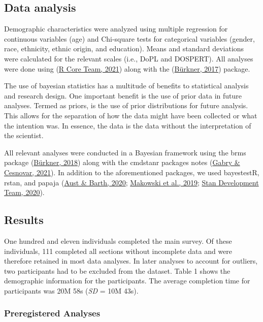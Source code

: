 \documentclass[
  donotrepeattitle,doc, 12pt, a4paper,floatsintext]{apa7}
\begin{document}
\hypertarget{data-analysis}{%
\subsection{Data analysis}\label{data-analysis}}

Demographic characteristics were analyzed using multiple regression for continuous variables (age) and Chi-square tests for categorical variables (gender, race, ethnicity, ethnic origin, and education). Means and standard deviations were calculated for the relevant scales (i.e., DoPL and DOSPERT). All analyses were done using (\protect\hyperlink{ref-rcoreteam2021}{R Core Team, 2021}) along with the (\protect\hyperlink{ref-burkner2017}{Bürkner, 2017}) package.

The use of bayesian statistics has a multitude of benefits to statistical analysis and research design. One important benefit is the use of prior data in future analyses. Termed as priors, is the use of prior distributions for future analysis. This allows for the separation of how the data might have been collected or what the intention was. In essence, the data is the data without the interpretation of the scientist.

All relevant analyses were conducted in a Bayesian framework using the brms package (\protect\hyperlink{ref-burkner2018}{Bürkner, 2018}) along with the cmdstanr packages notes (\protect\hyperlink{ref-gabry2021}{Gabry \& Cesnovar, 2021}). In addition to the aforementioned packages, we used bayestestR, rstan, and papaja (\protect\hyperlink{ref-aust2020}{Aust \& Barth, 2020}; \protect\hyperlink{ref-makowski2019}{Makowski et al., 2019}; \protect\hyperlink{ref-standevelopmentteam2020}{Stan Development Team, 2020}).

\hypertarget{results}{%
\subsection{Results}\label{results}}

One hundred and eleven individuals completed the main survey. Of these individuals, 111 completed all sections without incomplete data and were therefore retained in most data analyses. In later analyses to account for outliers, two participants had to be excluded from the dataset. Table 1 shows the demographic information for the participants. The average completion time for participants was 20M 58s (\emph{SD} = 10M 43s).

\hypertarget{preregistered-analyses}{%
\subsubsection{Preregistered Analyses}\label{preregistered-analyses}}
\end{document}

